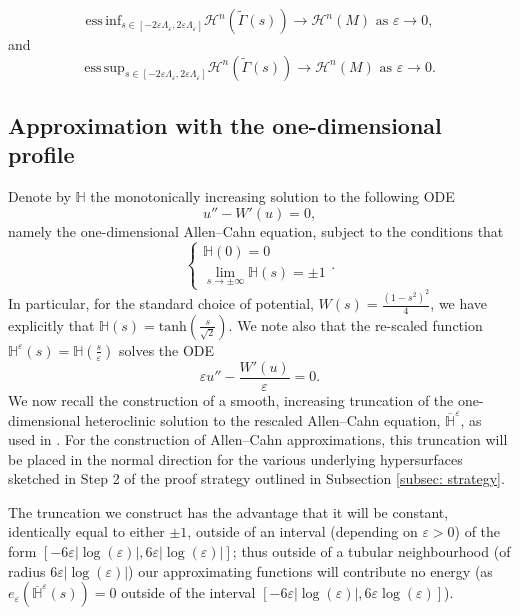 \documentclass[11pt]{article}
\newcommand{\esssup}{\mathrm{ess\, sup}}
\newcommand{\essinf}{\mathrm{ess\, inf}}
\begin{document}
\begin{equation}\label{eqn: essential infimum of measure of level sets converges to M}
   {\essinf}_{s \in [-2\varepsilon \Lambda_\varepsilon, 2\varepsilon \Lambda_\varepsilon]}\mathcal{H}^n(\widetilde{\Gamma}(s)) \rightarrow \mathcal{H}^n(M) \text{ as } \varepsilon \rightarrow 0,
\end{equation}
and
\begin{equation}\label{eqn: essential supremum of measure of level sets converges to M}
   {\esssup}_{s \in [-2\varepsilon \Lambda_\varepsilon, 2\varepsilon \Lambda_\varepsilon]}\mathcal{H}^n(\widetilde{\Gamma}(s)) \rightarrow \mathcal{H}^n(M) \text{ as } \varepsilon \rightarrow 0.
\end{equation}


\subsection{Approximation with the one-dimensional profile}\label{subsec: one dimensional profile}

Denote by $\mathbb{H}$ the monotonically increasing solution to the following ODE 
$$u'' - W'(u) = 0,$$
namely the one-dimensional Allen--Cahn equation, subject to the conditions that 
$$\begin{cases}
    \mathbb{H}(0) = 0\\
    \lim_{s \rightarrow \pm \infty} \mathbb{H}(s) = \pm 1
\end{cases}.$$ In particular, for the standard choice of potential, $W(s) = \frac{(1-s^2)^2}{4}$, we have explicitly that $\mathbb{H}(s) = \mathrm{tanh}(\frac{s}{\sqrt{2}})$. We note also that the re-scaled function $\mathbb{H}^\varepsilon(s) = \mathbb{H}(\frac{s}{\varepsilon})$ solves the ODE
$$\varepsilon u'' - \frac{W'(u)}{\varepsilon} = 0.$$
We now recall the construction of a smooth, increasing truncation of the one-dimensional heteroclinic solution to the rescaled Allen--Cahn equation, $\overline{\mathbb{H}}^\varepsilon$, as used in \cite{bellettini}. For the construction of Allen--Cahn approximations, this truncation will be placed in the normal direction for the various underlying hypersurfaces sketched in Step 2 of the proof strategy outlined in Subsection \ref{subsec: strategy}. 

\bigskip

The truncation we construct has the advantage that it will be constant, identically equal to either $\pm 1$, outside of an interval (depending on $\varepsilon > 0$) of the form $[-6\varepsilon|\log (\varepsilon)|,6\varepsilon|\log (\varepsilon)|]$; thus outside of a tubular neighbourhood (of radius $6\varepsilon|\log (\varepsilon)|$) our approximating functions will contribute no energy (as $e_\varepsilon(\overline{\mathbb{H}}^\varepsilon(s))= 0$ outside of the interval $[-6\varepsilon|\log (\varepsilon)|,6\varepsilon\log (\varepsilon)]$).
\end{document}
